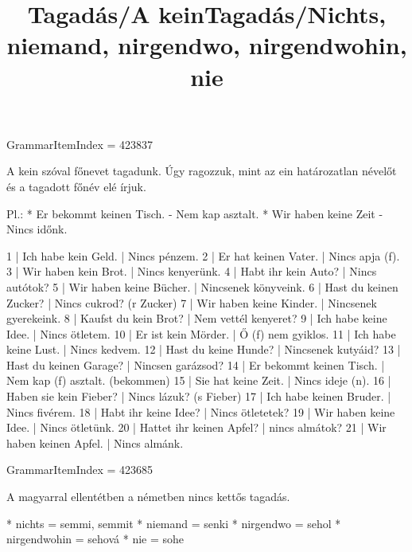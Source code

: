 \title{Tagadás/A kein}

GrammarItemIndex = 423837

\begin{desc}
A kein szóval főnevet tagadunk. Úgy ragozzuk, mint az ein határozatlan névelőt és a tagadott főnév elé írjuk.

Pl.: * Er bekommt keinen Tisch. - Nem kap asztalt.
* Wir haben keine Zeit - Nincs időnk.
\end{desc}

\begin{exmp}
1 | Ich habe kein Geld. | Nincs pénzem.
2 | Er hat keinen Vater. | Nincs apja (f).
3 | Wir haben kein Brot. | Nincs kenyerünk.
4 | Habt ihr kein Auto? | Nincs autótok?
5 | Wir haben keine Bücher. | Nincsenek könyveink.
6 | Hast du keinen Zucker? | Nincs cukrod? (r Zucker)
7 | Wir haben keine Kinder. | Nincsenek gyerekeink.
8 | Kaufst du kein Brot? | Nem vettél kenyeret?
9 | Ich habe keine Idee. | Nincs ötletem.
10 | Er ist kein Mörder. | Ő (f) nem gyiklos.
11 | Ich habe keine Lust. | Nincs kedvem.
12 | Hast du keine Hunde? | Nincsenek kutyáid?
13 | Hast du keinen Garage? | Nincsen garázsod?
14 | Er bekommt keinen Tisch. | Nem kap (f) asztalt. (bekommen)
15 | Sie hat keine Zeit. | Nincs ideje (n).
16 | Haben sie kein Fieber? | Nincs lázuk? (s Fieber)
17 | Ich habe keinen Bruder. | Nincs fivérem.
18 | Habt ihr keine Idee? | Nincs ötletetek?
19 | Wir haben keine Idee. | Nincs ötletünk.
20 | Hattet ihr keinen Apfel? | nincs almátok?
21 | Wir haben keinen Apfel. | Nincs almánk.
\end{exmp}

\title{Tagadás/Nichts, niemand, nirgendwo, nirgendwohin, nie}

GrammarItemIndex = 423685

\begin{desc}
A magyarral ellentétben a németben nincs kettős tagadás.

* nichts = semmi, semmit
* niemand = senki
* nirgendwo = sehol
* nirgendwohin = sehová
* nie = sohe
\end{desc}

